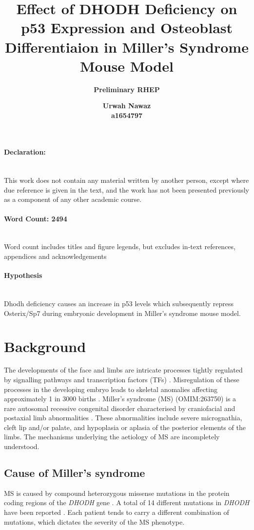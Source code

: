 \documentclass[12pt]{article}
\title{Effect of DHODH Deficiency on p53 Expression and Osteoblast Differentiaion in Miller's Syndrome Mouse Model}
\subtitle{\textbf{Preliminary RHEP}}
\author{ \textbf{Urwah Nawaz} \\ \textbf{a1654797}}
\date{}
\begin{document}
	\maketitle
	\paragraph{Declaration:}
	~\\This work does not contain any material written by another person, except where due reference is given in the text, and the work has not been presented previously as a component of any other academic course.	
	\paragraph{Word Count: 2494}
	~\\ Word count includes titles and figure legends, but excludes in-text references, appendices and acknowledgements 
\pagebreak
\paragraph{Hypothesis}
~\\ Dhodh deficiency causes an increase in p53 levels which subsequently repress Osterix/Sp7 during embryonic development in Miller's syndrome mouse model. 

	\section{Background}
	The developments of the face and limbs are intricate processes tightly regulated by signalling pathways and transcription factors (TFs) \citep{karsenty2009genetic}. Misregulation of these processes in the developing embryo leads to skeletal anomalies affecting approximately 1 in 3000 births \citep{stoll1989birth}. Miller's syndrome (MS) (OMIM:263750) is a rare autosomal recessive congenital disorder characterised by craniofacial and postaxial limb abnormalities \citep{miller1979postaxial}. These abnormalities include severe micrognathia, cleft lip and/or palate, and hypoplasia or aplasia of the posterior elements of the limbs.  The mechanisms underlying the aetiology of MS are incompletely understood. 
	
	 \subsection{Cause of Miller's syndrome}
	MS is caused by compound heterozygous missense mutations in the protein coding regions of the \textit{DHODH} gene \citep{ng2010exome}.  A total of 14 different mutations in \textit{DHODH} have been reported \citep{ng2010exome, doi:10.1093/hmg/dds218}. Each patient tends to carry a different combination of mutations, which dictates the severity of the MS phenotype. 
	
\end{document}
